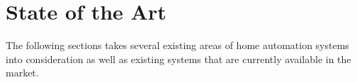 \section{State of the Art}\label{sec:sota}
The following sections takes several existing areas of home automation systems into consideration as well as existing systems that are currently available in the market.



